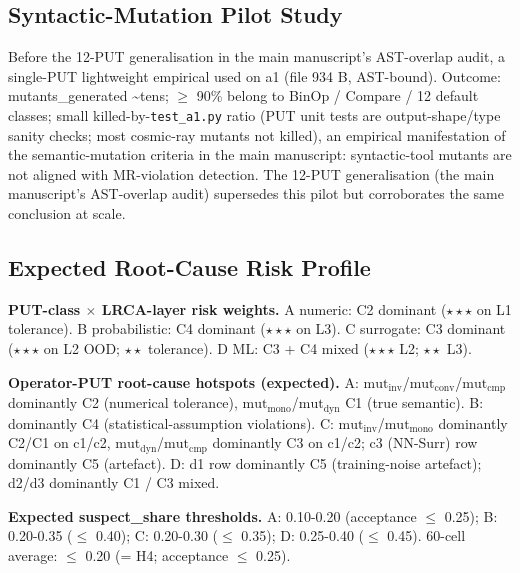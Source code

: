 \documentclass[manuscript,screen,review]{acmart}
\begin{document}
\subsection{Syntactic-Mutation Pilot Study}\label{b.3-cosmic-ray-a1-single-put-pilot-pre-12-put-empirical}

Before the 12-PUT generalisation in the main manuscript's AST-overlap audit, a single-PUT lightweight
empirical used  on a1 (file
934 B, AST-bound). Outcome: mutants\_generated \textasciitilde tens; $\geq$
90\% belong to BinOp / Compare / 12 default classes; small
killed-by-\texttt{test\_a1.py} ratio (PUT unit tests are
output-shape/type sanity checks; most cosmic-ray mutants not killed), an
empirical manifestation of the semantic-mutation criteria in the main manuscript: syntactic-tool mutants
are not aligned with MR-violation detection. The 12-PUT generalisation
(the main manuscript's AST-overlap audit) supersedes this pilot but corroborates the same conclusion at
scale.

\subsection{Expected Root-Cause Risk Profile}\label{b.4-expected-lrca-risk-profile}

\textbf{PUT-class $\times$ LRCA-layer risk weights.} A numeric: C2 dominant
($\star\star\star$ on L1 tolerance). B probabilistic: C4 dominant ($\star\star\star$ on L3). C
surrogate: C3 dominant ($\star\star\star$ on L2 OOD; $\star\star$ tolerance). D ML: C3 + C4
mixed ($\star\star\star$ L2; $\star\star$ L3).

\textbf{Operator-PUT root-cause hotspots (expected).} A:
$\mathrm{mut}_{\mathrm{inv}}$/$\mathrm{mut}_{\mathrm{conv}}$/$\mathrm{mut}_{\mathrm{cmp}}$
dominantly C2 (numerical tolerance), $\mathrm{mut}_{\mathrm{mono}}$/$\mathrm{mut}_{\mathrm{dyn}}$ C1 (true semantic). B:
dominantly C4 (statistical-assumption violations). C: $\mathrm{mut}_{\mathrm{inv}}$/$\mathrm{mut}_{\mathrm{mono}}$
dominantly C2/C1 on c1/c2, $\mathrm{mut}_{\mathrm{dyn}}$/$\mathrm{mut}_{\mathrm{cmp}}$ dominantly C3 on c1/c2; c3 (NN-Surr)
row dominantly C5 (artefact). D: d1 row dominantly C5 (training-noise
artefact); d2/d3 dominantly C1 / C3 mixed.

\textbf{Expected suspect\_share thresholds.} A: 0.10-0.20 (acceptance $\leq$
0.25); B: 0.20-0.35 ($\leq$ 0.40); C: 0.20-0.30 ($\leq$ 0.35); D: 0.25-0.40 ($\leq$
0.45). 60-cell average: $\leq$ 0.20 (= H4; acceptance $\leq$ 0.25).
\end{document}
